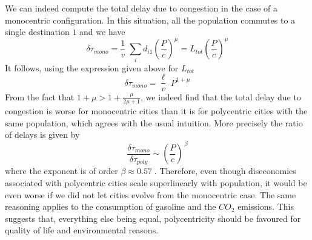 We can indeed compute the total delay due to congestion in the case of a monocentric configuration. In this situation, all the population commutes to a single destination $1$ and we have
%
\begin{equation}
\delta \tau_{mono} = \frac{1}{v}\; \sum_i d_{i1} \left(\frac{P}{c} \right)^\mu = L_{tot} \left(\frac{P}{c} \right)^\mu
\end{equation}
%
It follows, using the expression given above for $L_{tot}$
%
\begin{equation}
\delta\tau_{mono} = \frac{\ell}{v}\; P^{1+\mu}
\end{equation}
%
From the fact that $1+\mu > 1+\frac{\mu}{2\mu+1}$, we indeed find that the total delay due to
congestion is worse for monocentric cities than it is for polycentric cities with the same population, which agrees with the usual intuition. More precisely the ratio of delays is given by
%
\begin{equation}
\frac{\delta\tau_{mono}}{\delta\tau_{poly}}\sim
\left(\frac{P}{c}\right)^{\,\beta}
\end{equation}
%
where the exponent is of order $\beta \approx 0.57\;$. Therefore, even though diseconomies associated with polycentric cities scale superlinearly with population, it would be even worse if we did not let cities evolve from the monocentric case. The same reasoning applies to the consumption of gasoline and the $CO_2$ emissions. This suggests that, everything else being equal, polycentricity should be favoured for quality of life and environmental reasons.
%
